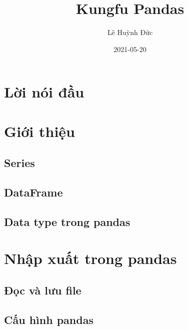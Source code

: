 \documentclass[
]{book}
\title{Kungfu Pandas}
\author{Lê Huỳnh Đức}
\date{2021-05-20}
\begin{document}
\maketitle

{
\setcounter{tocdepth}{1}
\tableofcontents
}
\hypertarget{lux1eddi-nuxf3i-ux111ux1ea7u}{%
\chapter*{Lời nói đầu}\label{lux1eddi-nuxf3i-ux111ux1ea7u}}

\hypertarget{giux1edbi-thiux1ec7u}{%
\chapter{Giới thiệu}\label{giux1edbi-thiux1ec7u}}

\hypertarget{series}{%
\section{Series}\label{series}}

\hypertarget{dataframe}{%
\section{DataFrame}\label{dataframe}}

\hypertarget{data-type-trong-pandas}{%
\section{Data type trong pandas}\label{data-type-trong-pandas}}

\hypertarget{nhux1eadp-xuux1ea5t-trong-pandas}{%
\chapter{Nhập xuất trong pandas}\label{nhux1eadp-xuux1ea5t-trong-pandas}}

\hypertarget{ux111ux1ecdc-vuxe0-lux1b0u-file}{%
\section{Đọc và lưu file}\label{ux111ux1ecdc-vuxe0-lux1b0u-file}}

\hypertarget{cux1ea5u-huxecnh-pandas}{%
\section{Cấu hình pandas}\label{cux1ea5u-huxecnh-pandas}}
\end{document}

